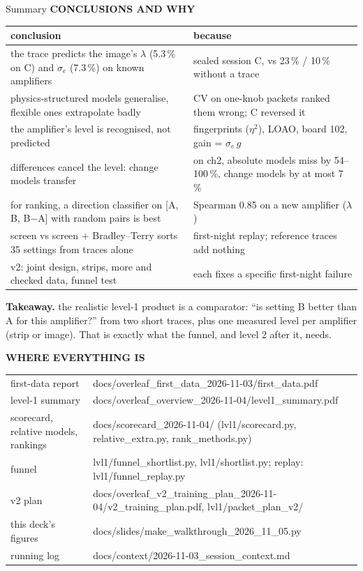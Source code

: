 \documentclass[aspectratio=169,11pt]{beamer}
\newcommand{\eyebrow}[2][trace]{{\color{#1}\scriptsize\bfseries\MakeUppercase{#2}}\par\vspace{0.1em}}
\newcommand{\takeaway}[1]{\par\vspace{0.3em}\colorbox{model!12}{\parbox{0.975\textwidth}{\scriptsize\textbf{Takeaway.} #1}}}
\begin{document}
\begin{frame}{Summary}
\eyebrow[model]{Conclusions and why}
\scriptsize
\begin{tabular}{p{6.2cm}p{6.6cm}}\toprule
conclusion & because\\\midrule
the trace predicts the image's $\lambda$ (5.3\,\% on C) and $\sigma_e$ (7.3\,\%) on known amplifiers & sealed session C, vs 23\,\% / 10\,\% without a trace\\
physics-structured models generalise, flexible ones extrapolate badly & CV on one-knob packets ranked them wrong; C reversed it\\
the amplifier's level is recognised, not predicted & fingerprints ($\eta^2$), LOAO, board 102, gain = $\sigma_e\,g$\\
differences cancel the level: change models transfer & on ch2, absolute models miss by 54--100\,\%, change models by at most 7\,\%\\
for ranking, a direction classifier on [A, B, B$-$A] with random pairs is best & Spearman 0.85 on a new amplifier ($\lambda$)\\
screen vs screen + Bradley--Terry sorts 35 settings from traces alone & first-night replay; reference traces add nothing\\
v2: joint design, strips, more and checked data, funnel test & each fixes a specific first-night failure\\\bottomrule
\end{tabular}
\vspace{0.5em}
\takeaway{the realistic level-1 product is a comparator: ``is setting B better than A for this amplifier?'' from two short traces, plus one measured level per amplifier (strip or image). That is exactly what the funnel, and level 2 after it, needs.}
\end{frame}

{
\begin{frame}[plain]
\vfill
{\color{trace!60}\small\bfseries WHERE EVERYTHING IS}\par\vspace{0.8em}
{\color{paper}\tiny
\begin{tabular}{ll}
first-data report & docs/overleaf\_first\_data\_2026-11-03/first\_data.pdf\\
level-1 summary & docs/overleaf\_overview\_2026-11-04/level1\_summary.pdf\\
scorecard, relative models, rankings & docs/scorecard\_2026-11-04/ (lvl1/scorecard.py, relative\_extra.py, rank\_methods.py)\\
funnel & lvl1/funnel\_shortlist.py, lvl1/shortlist.py; replay: lvl1/funnel\_replay.py\\
v2 plan & docs/overleaf\_v2\_training\_plan\_2026-11-04/v2\_training\_plan.pdf, lvl1/packet\_plan\_v2/\\
this deck's figures & docs/slides/make\_walkthrough\_2026\_11\_05.py\\
running log & docs/context/2026-11-03\_session\_context.md
\end{tabular}}
\vfill
\end{frame}}
\end{document}
